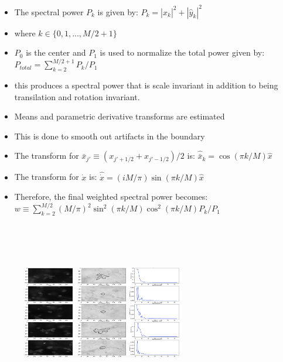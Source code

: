 \documentclass{beamer} %
\begin{document}
\begin{frame}
	\begin{itemize}
			\item The spectral power $P_k$ is given by:
			\newline
			$P_k = |\hat{x}_k|^2 + |\hat{y}_k|^2$
			\newline
			\item where $k \in \{0,1,...,M/2+1\}$
			\item $P_0$ is the center and $P_1$ is used to normalize the total power given by:
			\newline
			$P_{total} = \sum_{k=2}^{M/2+1} P_k/P_1$
			\item this produces a spectral power that is scale invariant in addition to being transilation and rotation invariant. 
	\end{itemize}
\end{frame}

\begin{frame}
	\begin{itemize}
			\item Means and parametric derivative transforms are estimated
			\item This is done to smooth out artifacts in the boundary 
			\item The transform for $\bar{x}_{j\prime} \equiv (x_{j\prime+1/2} + x_{j\prime-1/2})/2$ is: 
			\newline
			$\hat{\bar{x}}_k = \cos(\pi k/M)\hat{x}$ 
			\newline
			\item The transform for $\dot{x}$ is: 
			\newline
			$\hat{\dot{x}} = (iM/\pi)\sin(\pi k/M)\hat{x}$
			\item Therefore, the final weighted spectral power becomes:
			\newline
			$w \equiv \sum_{k=2}^{M/2} (M/\pi)^2 \sin^2(\pi k/M) \cos^2(\pi k/M) P_k/P_1$
	\end{itemize}
\end{frame}

\begin{frame}
	\begin{figure}
		\centering
		\includegraphics[width=7cm, height=8cm]{Image1}
	\end{figure}
\end{frame}
\end{document}
